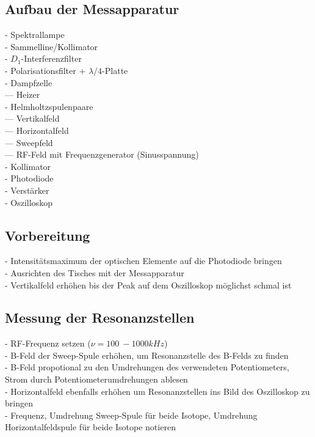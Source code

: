 \subsection{Aufbau der Messapparatur}
- Spektrallampe\\
- Sammelline/Kollimator\\
- $D_{1}$-Interferenzfilter\\
- Polarisationsfilter + $\lambda/4$-Platte\\
- Dampfzelle\\
  --- Heizer\\
- Helmholtzspulenpaare\\
  --- Vertikalfeld\\
  --- Horizontalfeld\\
  --- Sweepfeld\\
  --- RF-Feld mit Frequenzgenerator (Sinusspannung)\\
- Kollimator\\
- Photodiode\\
- Verstärker\\
- Oszilloskop\\


\subsection{Vorbereitung}
- Intensitätsmaximum der optischen Elemente auf die Photodiode bringen\\
- Ausrichten des Tisches mit der Messapparatur\\
- Vertikalfeld erhöhen bis der Peak auf dem Oszilloskop möglichst schmal ist\\

\subsection{Messung der Resonanzstellen}
- RF-Frequenz setzen ($\nu=\SI{100}{}-{1000}{kHz}$)\\
- B-Feld der Sweep-Spule erhöhen, um Resonanzstelle des B-Felds zu finden\\
- B-Feld propotional zu den Umdrehungen des verwendeten Potentiometers, Strom durch Potentiometerumdrehungen ablesen\\
- Horizontalfeld ebenfalls erhöhen um Resonanzstellen ins Bild des Oszilloskop zu bringen\\
- Frequenz, Umdrehung Sweep-Spule für beide Isotope, Umdrehung Horizontalfeldspule für beide Isotope notieren\\
